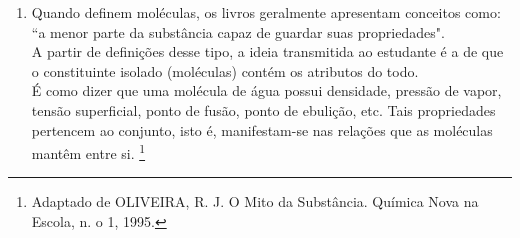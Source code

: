 \documentclass[10pt,a4paper]{article}
\begin{document}
\begin{multicols}{2}
\begin{enumerate}
b) Distrito Federal, 1999 - Cilindros contendo cloro, g\'as bactericida utilizado em tratamento de \'agua, encontrados em um dep\'osito de sucatas, foram abertos por pessoa que desconhecia o seu conte\'udo. \\
Resultado: mortes, intoxica\c{c}ões e consequências ambientais sentidas por v\'arias horas.\\
Para evitar que novos acontecimentos dessa natureza venham a ocorrer, foram feitas as seguintes
propostas para a atua\c{c}\~ao do Estado:\\

I. Proibir o uso de materiais radioativos e gases t\'oxicos. \\
II. Controlar rigorosamente a compra, uso e destino de materiais radioativos e de recipientes contendo gases t\'oxicos. \\
III. Instruir usu\'arios sobre a utiliza\c{c}\~ao e descarte destes materiais.\\
IV. Realizar campanhas de esclarecimentos \`a popula\c{c}\~ao sobre os riscos da radia\c{c}\~ao e da toxicidade de determinadas substâncias. \\
V. Proibir produtos qu\'imicos.\\

	Dessas respostas, s\~ao adequadas apenas:
		\begin{enumerate}
		\item I, III e V.
		\item I, II e V.
		\item II e III
		\item I, III e IV.
		\item II, III e IV.
		\end{enumerate}



	\item Quando definem mol\'eculas, os livros geralmente apresentam conceitos como: ``a menor parte da substância capaz de guardar suas propriedades". \\
	A partir de defini\c{c}ões desse tipo, a ideia transmitida ao estudante \'e a de que o constituinte isolado (mol\'eculas) cont\'em os atributos do todo.\\
	\'E como dizer que uma mol\'ecula de \'agua possui densidade, press\~ao de vapor, tens\~ao superficial, ponto de fus\~ao, ponto de ebuli\c{c}\~ao, etc. Tais propriedades pertencem ao conjunto, isto \'e, manifestam-se nas rela\c{c}ões que as mol\'eculas mantêm entre si. \footnote{Adaptado de OLIVEIRA, R. J. O Mito da Substância. Qu\'imica Nova na Escola, n. o 1, 1995.}


\end{enumerate}
\end{multicols}
\end{document}
